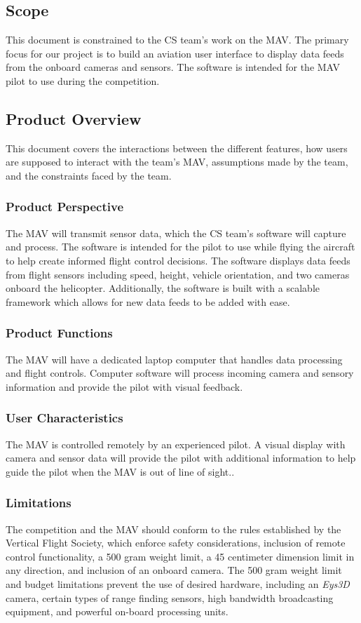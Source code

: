\documentclass[onecolumn, oneside, letterpaper, draftclsnofoot, 10pt, compsoc]{IEEEtran}
\begin{document}
\subsection{Scope}
This document is constrained to the CS team’s work on the MAV. The primary focus for our project is to build an aviation user interface to display data feeds from the onboard cameras and sensors. The software is intended for the MAV pilot to use during the competition.

\subsection{Product Overview}
This document covers the interactions between the different features, how users are supposed to interact with the team’s MAV, assumptions made by the team, and the constraints faced by the team.

\subsubsection{Product Perspective}
The MAV will transmit sensor data, which the CS team’s software will capture and process. The software is intended for the pilot to use while flying the aircraft to help create informed flight control decisions. The software displays data feeds from flight sensors including speed, height, vehicle orientation, and two cameras onboard the helicopter. Additionally, the software is built with a scalable framework which allows for new data feeds to be added with ease.

\subsubsection{Product Functions}
The MAV will have a dedicated laptop computer that handles data processing and flight controls. Computer software will process incoming camera and sensory information and provide the pilot with visual feedback.

\subsubsection{User Characteristics}
The MAV is controlled remotely by an experienced pilot. A visual display with camera and sensor data will provide the pilot with additional information to help guide the pilot when the MAV is out of line of sight..

\subsubsection{Limitations}
The competition and the MAV should conform to the rules established by the Vertical Flight Society, which enforce safety considerations, inclusion of remote control functionality, a 500 gram weight limit, a 45 centimeter dimension limit in any direction, and inclusion of an onboard camera. The 500 gram weight limit and budget limitations prevent the use of desired hardware, including an \textit{Eys3D} camera, certain types of range finding sensors, high bandwidth broadcasting equipment, and powerful on-board processing units.
\end{document}
